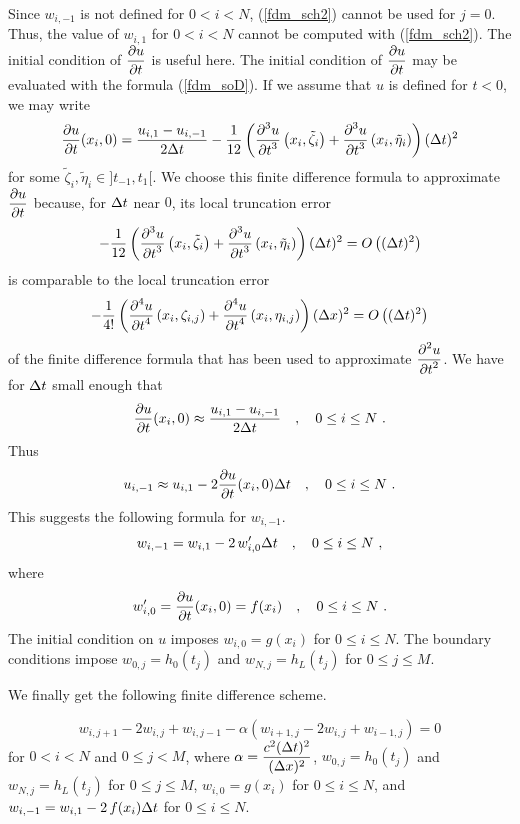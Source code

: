 Since $w_{i,-1}$ is not defined for $0<i<N$, (\ref{fdm_sch2}) cannot
be used for $j=0$.  Thus, the value of $w_{i,1}$ for $0<i<N$ cannot
be computed with (\ref{fdm_sch2}).  The initial condition of
$\displaystyle \frac{\partial{u}}{\partial{t}}$ is useful here.  The initial condition of
$\displaystyle \frac{\partial{u}}{\partial{t}}$ may be evaluated with the formula
(\ref{fdm_soD}).  If we assume that $u$ is defined for $t<0$, we may
write
\[
\frac{\partial{u}}{\partial{t}}(x_i,0) = \frac{u_{i,1}- u_{i,-1}}{2\Delta{t}}
- \frac{1}{12} \left( \frac{\displaystyle \partial^{3}{u}} {\displaystyle \partial{t}^{3}}\left(x_i,\tilde{\zeta}_i\right)
+ \frac{\displaystyle \partial^{3}{u}} {\displaystyle \partial{t}^{3}}\left(x_i,\tilde{\eta}_i\right)\right) (\Delta{t})^2
\]
for some $\tilde{\zeta}_i, \tilde{\eta}_i \in ]t_{-1},t_1[$.  We choose this
finite difference formula to approximate $\displaystyle \frac{\partial{u}}{\partial{t}}$
because, for $\Delta{t}$ near $0$, its local truncation error
\[
- \frac{1}{12} \left( \frac{\displaystyle \partial^{3}{u}} {\displaystyle \partial{t}^{3}}\left(x_i,\tilde{\zeta}_i\right)
+ \frac{\displaystyle \partial^{3}{u}} {\displaystyle \partial{t}^{3}}\left(x_i,\tilde{\eta}_i\right)\right) (\Delta{t})^2
= O\left((\Delta{t})^2\right)
\]
is comparable to the local truncation error
\[
- \frac{1}{4!} \left( \frac{\displaystyle \partial^{4}{u}} {\displaystyle \partial{t}^{4}}\left(x_i,\zeta_{i,j} \right)
+ \frac{\displaystyle \partial^{4}{u}} {\displaystyle \partial{t}^{4}}\left(x_i,\eta_{i,j} \right) \right) (\Delta{x})^2
= O\left((\Delta{t})^2\right)
\]
of the finite difference formula that has been
used to approximate $\displaystyle \frac{\displaystyle \partial^{2}{u}} {\displaystyle \partial{t}^{2}}$.  We have for
$\Delta{t}$ small enough that
\[
\frac{\partial{u}}{\partial{t}}(x_i,0) \approx \frac{u_{i,1}- u_{i,-1}}{2\Delta{t}}
\quad , \quad 0 \leq i \leq N \ .
\]
Thus
\[
u_{i,-1} \approx u_{i,1} - 2 \frac{\partial{u}}{\partial{t}}(x_i,0) \Delta{t} \quad ,
\quad 0 \leq i \leq N \ .
\]
This suggests the following formula for $w_{i,-1}$.
\[
w_{i,-1} = w_{i,1} - 2 \,w_{i,0}'\Delta{t} \quad , \quad 0 \leq i \leq N \ ,
\]
where
\[
w_{i,0}' = \frac{\partial{u}}{\partial{t}}(x_i,0) = f(x_i) \quad , \quad 0 \leq i \leq N \ .
\]
The initial condition on $u$ imposes $w_{i,0} = g(x_i)$ for $0 \leq i \leq N$.
The boundary conditions impose $w_{0,j} = h_0(t_j)$ and $w_{N,j} = h_L(t_j)$
for $0\leq j \leq M$.

We finally get the following finite difference scheme.

\begin{algo} \label{fdm_sch3S}
\[
w_{i,j+1} - 2w_{i,j} + w_{i,j-1} - \alpha \left( w_{i+1,j} - 2w_{i,j} +
w_{i-1,j}\right) = 0
\]
for $0 < i < N$ and $0 \leq j < M$, where
$\displaystyle \alpha = \frac{c^2(\Delta{t})^2}{(\Delta{x})^2}$,
$w_{0,j} = h_0(t_j)$ and $w_{N,j} = h_L(t_j)$ for $0\leq j \leq M$,
$w_{i,0} = g(x_i)$ for $0 \leq i \leq N$, and
$w_{i,-1} = w_{i,1} - 2\,f(x_i)\Delta{t}$ for $0 \leq i \leq N$.
\end{algo}


